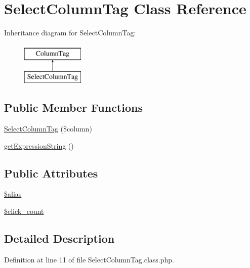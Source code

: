 \hypertarget{classSelectColumnTag}{\section{Select\-Column\-Tag Class Reference}
\label{classSelectColumnTag}
}
Inheritance diagram for Select\-Column\-Tag\-:\begin{figure}[H]
\begin{center}
\leavevmode
\includegraphics[height=2.000000cm]{classSelectColumnTag}
\end{center}
\end{figure}
\subsection*{Public Member Functions}
\begin{DoxyCompactItemize}
\item 
\hyperlink{classSelectColumnTag_a05e82794cb692f0af9a7da2eb41a229d}{Select\-Column\-Tag} (\$column)
\item 
\hyperlink{classSelectColumnTag_a4e4b646d742cb51b7c72f0d953717e3a}{get\-Expression\-String} ()
\end{DoxyCompactItemize}
\subsection*{Public Attributes}
\begin{DoxyCompactItemize}
\item 
\hyperlink{classSelectColumnTag_a152fca9e152d65e4697ad823ffaa101b}{\$alias}
\item 
\hyperlink{classSelectColumnTag_a5965b8a6c68685c6b99dd88f4fd87f52}{\$click\-\_\-count}
\end{DoxyCompactItemize}


\subsection{Detailed Description}


Definition at line 11 of file Select\-Column\-Tag.\-class.\-php.



